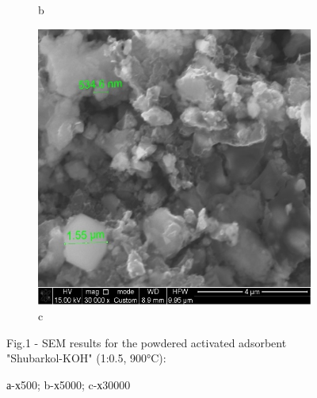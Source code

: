 \begin{figure}[H]
\begin{subfigure}[b]{0.32\textwidth}
        \caption*{b}
    \end{subfigure}
    \hfill
    \begin{subfigure}[b]{0.32\textwidth}
        \centering
        \includegraphics[width=\textwidth,height=\textwidth]{media/chem2/image11}
        \caption*{c}
    \end{subfigure}
    \caption*{Fig.1 - SEM results for the powdered activated adsorbent "Shubarkol-KOH" (1:0.5, 900°C):}
    \caption*{а-х500; b-х5000; c-х30000}
\end{figure}

